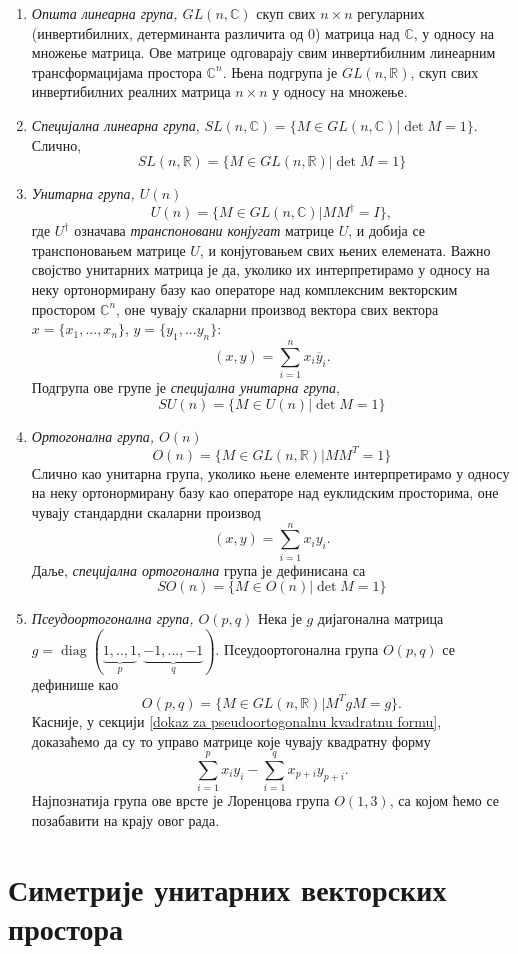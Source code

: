 \documentclass{report}
\theoremstyle{plain}
\theoremstyle{definition}
\begin{document}
\begin{enumerate}
  \item \emph{Општа линеарна група, $GL(n, \mathbb{C})$} скуп свих $n\times n$ регуларних (инвертибилних, детерминанта различита од 0) матрица над $\mathbb{C}$, у односу на множење матрица. Ове матрице одговарају свим инвертибилним линеарним трансформацијама простора $\mathbb{C}^n$. Њена подгрупа је $GL(n, \mathbb{R})$, скуп свих инвертибилних реалних матрица $n\times n$ у односу на множење.
  \item \emph{Специјална линеарна група}, $SL(n, \mathbb{C}) = \{M\in GL(n, \mathbb{C})|\det M = 1\}$. Слично,
  $$SL(n, \mathbb{R}) = \{M\in GL(n, \mathbb{R})|\det M = 1\}$$
  \item \emph{Унитарна група, $U(n)$}
  $$U(n) = \{M\in GL(n, \mathbb{C})|MM^\dag = I\},$$
  где $U^\dag$ означава \emph{транспоновани конјугат} матрице $U$, и добија се транспоновањем матрице $U$, и конјуговањем свих њених елемената. Важно својство унитарних матрица је да, уколико их интерпретирамо у односу на неку ортонормирану базу као операторе над комплексним векторским простором $\mathbb{C}^n$, оне чувају скаларни производ вектора свих вектора $x = \{x_1, ..., x_n\}$, $y = \{y_1, ...y_n\}$:
  $$(x, y) = \sum_{i=1}^n x_i \overline{y}_i.$$
  Подгрупа ове групе је \emph{специјална унитарна група},
  $$SU(n) = \{M\in U(n)|\det M = 1\}$$
  \item \emph{Ортогонална група, $O(n)$}
  $$O(n) = \{M\in GL(n, \mathbb{R})|MM^T = 1\}$$
  Слично као унитарна група, уколико њене елементе интерпретирамо у односу на неку ортонормирану базу као операторе над еуклидским просторима, оне чувају стандардни скаларни производ
  $$(x, y) = \sum_{i=1}^n x_i y_i.$$
  Даље, \emph{специјална ортогонална} група је дефинисана са
  $$SO(n) = \{M\in O(n)|\det M = 1\}$$
  \item \emph{Псеудоортогонална група, $O(p, q)$} Нека је $g$ дијагонална матрица $g = \operatorname{diag}(\underbrace{1, .., 1}_p, \underbrace{-1, ..., -1}_q)$. Псеудоортогонална група $O(p, q)$ се дефинише као
      $$O(p, q) = \{M\in GL(n, \mathbb{R})|M^TgM = g\}.$$
      Касније, у секцији \ref{dokaz za pseudoortogonalnu kvadratnu formu}, доказаћемо да су то управо матрице које чувају квадратну форму
      $$\sum_{i=1}^p x_iy_i - \sum_{i=1}^q x_{p+i}y_{p+i}.$$
  Најпознатија група ове врсте је Лоренцова група $O(1, 3)$, са којом ћемо се позабавити на крају овог рада.
\end{enumerate}

\section{Симетрије унитарних векторских простора}
\end{document}
